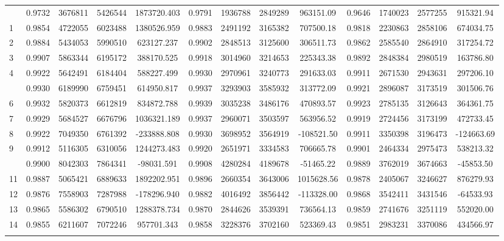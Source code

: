 \documentclass[
  12pt,
]{article}
\begin{document}
\begin{longtable}[t]{lcccccccccccc}
\endfoot
\bottomrule
\endlastfoot
0 & 0.9732 & 3676811 & 5426544 & 1873720.403 & 0.9791 & 1936788 & 2849289 & 963151.09 & 0.9646 & 1740023 & 2577255 & 915321.94\\
1 & 0.9854 & 4722055 & 6023488 & 1380526.959 & 0.9883 & 2491192 & 3165382 & 707500.18 & 0.9818 & 2230863 & 2858106 & 674034.75\\
2 & 0.9884 & 5434053 & 5990510 & 623127.237 & 0.9902 & 2848513 & 3125600 & 306511.73 & 0.9862 & 2585540 & 2864910 & 317254.72\\
3 & 0.9907 & 5863344 & 6195172 & 388170.525 & 0.9918 & 3014960 & 3214653 & 225343.38 & 0.9892 & 2848384 & 2980519 & 163786.80\\
4 & 0.9922 & 5642491 & 6184404 & 588227.499 & 0.9930 & 2970961 & 3240773 & 291633.03 & 0.9911 & 2671530 & 2943631 & 297206.10\\
\addlinespace
5 & 0.9930 & 6189990 & 6759451 & 614950.817 & 0.9937 & 3293903 & 3585932 & 313772.09 & 0.9921 & 2896087 & 3173519 & 301506.76\\
6 & 0.9932 & 5820373 & 6612819 & 834872.788 & 0.9939 & 3035238 & 3486176 & 470893.57 & 0.9923 & 2785135 & 3126643 & 364361.75\\
7 & 0.9929 & 5684527 & 6676796 & 1036321.189 & 0.9937 & 2960071 & 3503597 & 563956.52 & 0.9919 & 2724456 & 3173199 & 472733.45\\
8 & 0.9922 & 7049350 & 6761392 & -233888.808 & 0.9930 & 3698952 & 3564919 & -108521.50 & 0.9911 & 3350398 & 3196473 & -124663.69\\
9 & 0.9912 & 5116305 & 6310056 & 1244273.483 & 0.9920 & 2651971 & 3334583 & 706665.78 & 0.9901 & 2464334 & 2975473 & 538213.32\\
\addlinespace
10 & 0.9900 & 8042303 & 7864341 & -98031.591 & 0.9908 & 4280284 & 4189678 & -51465.22 & 0.9889 & 3762019 & 3674663 & -45853.50\\
11 & 0.9887 & 5065421 & 6889633 & 1892202.951 & 0.9896 & 2660354 & 3643006 & 1015628.56 & 0.9878 & 2405067 & 3246627 & 876279.93\\
12 & 0.9876 & 7558903 & 7287988 & -178296.940 & 0.9882 & 4016492 & 3856442 & -113328.00 & 0.9868 & 3542411 & 3431546 & -64533.93\\
13 & 0.9865 & 5586302 & 6790510 & 1288378.734 & 0.9870 & 2844626 & 3539391 & 736564.13 & 0.9859 & 2741676 & 3251119 & 552020.00\\
14 & 0.9855 & 6211607 & 7072246 & 957701.343 & 0.9858 & 3228376 & 3702160 & 523369.43 & 0.9851 & 2983231 & 3370086 & 434566.97\\
\addlinespace

\end{longtable}
\end{document}
